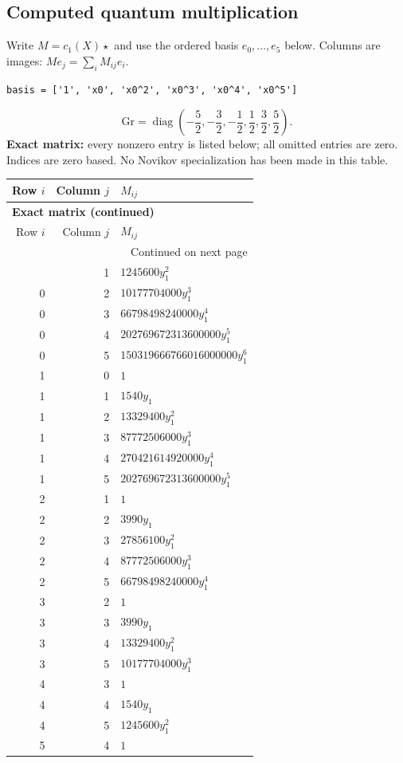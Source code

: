\documentclass[10pt,a4paper]{article}
\begin{document}
\subsection*{Computed quantum multiplication}
Write $M=c_1(X)\star$ and use the ordered basis $e_0,\ldots,e_{5}$ below. Columns are images: $M e_j=\sum_i M_{ij}e_i$.
\begin{lstlisting}
basis = ['1', 'x0', 'x0^2', 'x0^3', 'x0^4', 'x0^5']
\end{lstlisting}
\[\mathrm{Gr}=\operatorname{diag}\!\left(- \frac{5}{2},- \frac{3}{2},- \frac{1}{2},\frac{1}{2},\frac{3}{2},\frac{5}{2}\right).\]
\textbf{Exact matrix:} every nonzero entry is listed below; all omitted entries are zero. Indices are zero based. No Novikov specialization has been made in this table.
{\small\setlength{\tabcolsep}{7pt}\begin{longtable}{rrp{125mm}}
\toprule Row $i$ & Column $j$ & $M_{ij}$\\\midrule\endfirsthead
\multicolumn{3}{l}{\textbf{Exact matrix (continued)}}\\
\toprule Row $i$ & Column $j$ & $M_{ij}$\\\midrule\endhead
\midrule\multicolumn{3}{r}{Continued on next page}\\\endfoot\bottomrule\endlastfoot
0 & 1 & $1245600 y_{1}^{2}$\\
0 & 2 & $10177704000 y_{1}^{3}$\\
0 & 3 & $66798498240000 y_{1}^{4}$\\
0 & 4 & $202769672313600000 y_{1}^{5}$\\
0 & 5 & $150319666766016000000 y_{1}^{6}$\\
1 & 0 & $1$\\
1 & 1 & $1540 y_{1}$\\
1 & 2 & $13329400 y_{1}^{2}$\\
1 & 3 & $87772506000 y_{1}^{3}$\\
1 & 4 & $270421614920000 y_{1}^{4}$\\
1 & 5 & $202769672313600000 y_{1}^{5}$\\
2 & 1 & $1$\\
2 & 2 & $3990 y_{1}$\\
2 & 3 & $27856100 y_{1}^{2}$\\
2 & 4 & $87772506000 y_{1}^{3}$\\
2 & 5 & $66798498240000 y_{1}^{4}$\\
3 & 2 & $1$\\
3 & 3 & $3990 y_{1}$\\
3 & 4 & $13329400 y_{1}^{2}$\\
3 & 5 & $10177704000 y_{1}^{3}$\\
4 & 3 & $1$\\
4 & 4 & $1540 y_{1}$\\
4 & 5 & $1245600 y_{1}^{2}$\\
5 & 4 & $1$\\
\end{longtable}}
\end{document}
